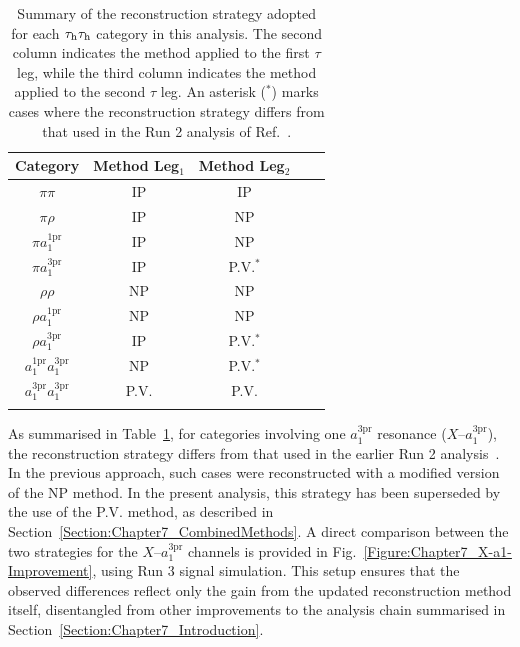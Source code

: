 \begin{table}[!htbp]
\centering
\renewcommand{\arraystretch}{1.5} %
\setlength{\tabcolsep}{10pt} %
\begin{tabular}{ccccc}
\hline
Category & Method Leg$_1$ & Method Leg$_2$\\
\hline
$\pi\pi$       & \ac{IP} & \ac{IP} \\
\arrayrulecolor{lightgray} \hline
$\pi\rho$       & \ac{IP} & \ac{NP} \\
\arrayrulecolor{lightgray} \hline
$\pi a_1^\text{1pr}$       & \ac{IP} & \ac{NP} \\
\arrayrulecolor{lightgray} \hline
$\pi a_1^\text{3pr}$       & \ac{IP} & \ac{P.V.}$^*$ \\
\arrayrulecolor{lightgray} \hline
$\rho\rho$       & \ac{NP} & \ac{NP} \\
\arrayrulecolor{lightgray} \hline
$\rho a_1^\text{1pr}$       & \ac{NP} & \ac{NP} \\
\arrayrulecolor{lightgray} \hline
$\rho a_1^\text{3pr}$       & \ac{IP} & \ac{P.V.}$^*$ \\
\arrayrulecolor{lightgray} \hline
$a_1^\text{1pr} a_1^\text{3pr}$       & \ac{NP} & \ac{P.V.}$^*$ \\
\arrayrulecolor{lightgray} \hline
$a_1^\text{3pr} a_1^\text{3pr}$       & \ac{P.V.} & \ac{P.V.} \\
\arrayrulecolor{black} \hline
\end{tabular}
\caption[Summary of reconstruction methods per $\tauh\tauh$ category.]
{Summary of the reconstruction strategy adopted for each $\tauh\tauh$ category in this analysis. The second column indicates the method applied to the first $\tau$ leg, while the third column indicates the method applied to the second $\tau$ leg. An asterisk ($^*$) marks cases where the reconstruction strategy differs from that used in the Run 2 analysis of Ref.~\cite{HiggsCP_CMS_2021}.}
\label{Table:Chapter7_ReconstructionMethodSummary}
\end{table}

As summarised in Table~\ref{Table:Chapter7_ReconstructionMethodSummary}, for categories involving one $a_1^{3\mathrm{pr}}$ resonance (\ie $X$–$a_1^{3\mathrm{pr}}$), the reconstruction strategy differs from that used in the earlier Run 2 analysis~\cite{HiggsCP_CMS_2021}. In the previous approach, such cases were reconstructed with a modified version of the \ac{NP} method. In the present analysis, this strategy has been superseded by the use of the \ac{P.V.} method, as described in Section~\ref{Section:Chapter7_CombinedMethods}. A direct comparison between the two strategies for the $X$–$a_1^{3\mathrm{pr}}$ channels is provided in Fig.~\ref{Figure:Chapter7_X-a1-Improvement}, using Run 3 signal simulation. This setup ensures that the observed differences reflect only the gain from the updated reconstruction method itself, disentangled from other improvements to the analysis chain summarised in Section~\ref{Section:Chapter7_Introduction}.

